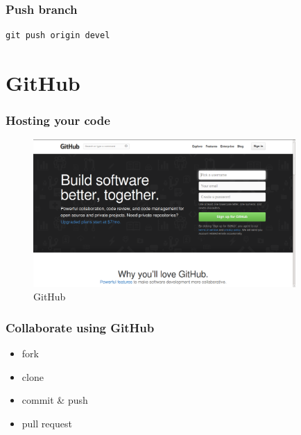 \documentclass[bigger, presentation]{beamer}
\begin{document}
\begin{frame}[fragile]
\frametitle{Push branch}
\label{sec-3-6}



\begin{verbatim}
git push origin devel
\end{verbatim}
\end{frame}
\section{GitHub}
\label{sec-4}
\begin{frame}
\frametitle{Hosting your code}
\label{sec-4-1}



  \begin{figure}[htb]
  \centering
  \includegraphics[width=10cm,angle=0]{./github.png}
  \caption{\label{fig:GitHub}GitHub}
  \end{figure}
\end{frame}
\begin{frame}
\frametitle{Collaborate using GitHub}
\label{sec-4-2}


\begin{itemize}
\item fork
\item clone
\item commit \& push
\item pull request
\end{itemize}
\end{frame}
\end{document}
